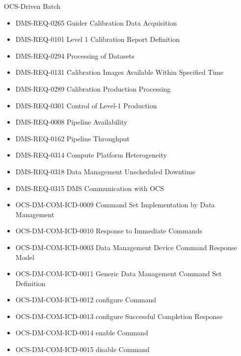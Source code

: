 OCS-Driven Batch \begin{itemize}
\item DMS-REQ-0265 Guider Calibration Data Acquisition
\item DMS-REQ-0101 Level 1 Calibration Report Definition
\item DMS-REQ-0294 Processing of Datasets
\item DMS-REQ-0131 Calibration Images Available Within Specified Time
\item DMS-REQ-0289 Calibration Production Processing
\item DMS-REQ-0301 Control of Level-1 Production
\item DMS-REQ-0008 Pipeline Availability
\item DMS-REQ-0162 Pipeline Throughput
\item DMS-REQ-0314 Compute Platform Heterogeneity
\item DMS-REQ-0318 Data Management Unscheduled Downtime
\item DMS-REQ-0315 DMS Communication with OCS
\item OCS-DM-COM-ICD-0009 Command Set Implementation by Data Management
\item OCS-DM-COM-ICD-0010 Response to Immediate Commands
\item OCS-DM-COM-ICD-0003 Data Management Device Command Response Model
\item OCS-DM-COM-ICD-0011 Generic Data Management Command Set Definition
\item OCS-DM-COM-ICD-0012 configure Command
\item OCS-DM-COM-ICD-0013 configure Successful Completion Response
\item OCS-DM-COM-ICD-0014 enable Command
\item OCS-DM-COM-ICD-0015 disable Command
\end{itemize}
